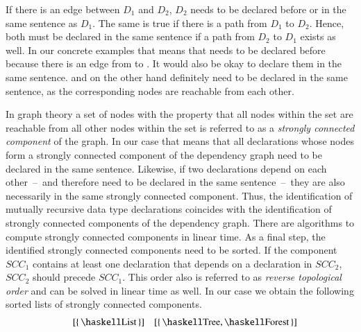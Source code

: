 If there is an edge between $D_1$ and $D_2$, $D_2$ needs to be declared before or in the same sentence as $D_1$.
The same is true if there is a path from $D_1$ to $D_2$.
Hence, both must be declared in the same sentence if a path from $D_2$ to $D_1$ exists as well.
In our concrete examples that means that  needs to be declared before  because there is an edge from  to .
It would also be okay to declare them in the same sentence.
 and  on the other hand definitely need to be declared in the same sentence, as the corresponding nodes are reachable from each other.

In graph theory a set of nodes with the property that all nodes within the set are reachable from all other nodes within the set is referred to as a \textit{strongly connected component} of the graph.
In our case that means that all declarations whose nodes form a strongly connected component of the dependency graph need to be declared in the same sentence.
Likewise, if two declarations depend on each other~--~and therefore need to be declared in the same sentence~--~they are also necessarily in the same strongly connected component.
Thus, the identification of mutually recursive data type declarations coincides with the identification of strongly connected components of the dependency graph.
There are algorithms to compute strongly connected components in linear time.
As a final step, the identified strongly connected components need to be sorted.
If the component $SCC_1$ contains at least one declaration that depends on a declaration in $SCC_2$, $SCC_2$ should precede $SCC_1$.
This order also is referred to as \textit{reverse topological order} and can be solved in linear time as well.
In our case we obtain the following sorted lists of strongly connected components.
\begin{align*}
  [\{\, \haskellM{B} \,\}, \{\, \haskellM{A} \,\}]
  && [\{\, \haskellM{List} \,\}]
  && [\{\, \haskellM{Tree}, \haskellM{Forest} \,\}]
\end{align*}

